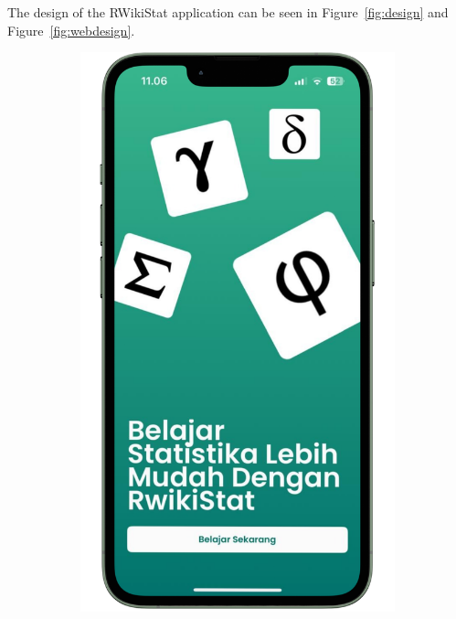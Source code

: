 \documentclass[conference,a4paper]{IEEEtran}
\begin{document}
\begin{enumerate}
        The design of the RWikiStat application can be seen in Figure~\ref{fig:design} and Figure~\ref{fig:webdesign}.
        \begin{figure}[H]
          \centering
          \begin{subfigure}{0.49\linewidth}
            \centering
            \includegraphics[width=\linewidth]{images/welcome.png}
          \end{subfigure}
          \hfill
          \begin{subfigure}{0.49\linewidth}

\end{subfigure}
\end{figure}
\end{enumerate}
\end{document}
